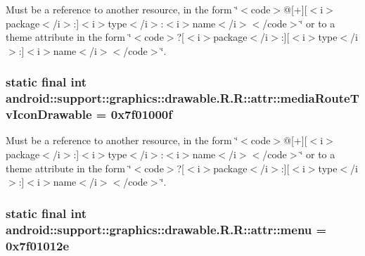 Must be a reference to another resource, in the form \char`\"{}$<$code$>$@\mbox{[}+\mbox{]}\mbox{[}$<$i$>$package$<$/i$>$:\mbox{]}$<$i$>$type$<$/i$>$:$<$i$>$name$<$/i$>$$<$/code$>$\char`\"{} or to a theme attribute in the form \char`\"{}$<$code$>$?\mbox{[}$<$i$>$package$<$/i$>$:\mbox{]}\mbox{[}$<$i$>$type$<$/i$>$:\mbox{]}$<$i$>$name$<$/i$>$$<$/code$>$\char`\"{}. \hypertarget{classandroid_1_1support_1_1graphics_1_1drawable_1_1_r_1_1attr_d38f866d8e4f17061aae25a6fe1066c7}{
\subsubsection[{mediaRouteTvIconDrawable}]{\setlength{\rightskip}{0pt plus 5cm}static final int android::support::graphics::drawable.R.R::attr::mediaRouteTvIconDrawable = 0x7f01000f}}
\label{classandroid_1_1support_1_1graphics_1_1drawable_1_1_r_1_1attr_d38f866d8e4f17061aae25a6fe1066c7}


Must be a reference to another resource, in the form \char`\"{}$<$code$>$@\mbox{[}+\mbox{]}\mbox{[}$<$i$>$package$<$/i$>$:\mbox{]}$<$i$>$type$<$/i$>$:$<$i$>$name$<$/i$>$$<$/code$>$\char`\"{} or to a theme attribute in the form \char`\"{}$<$code$>$?\mbox{[}$<$i$>$package$<$/i$>$:\mbox{]}\mbox{[}$<$i$>$type$<$/i$>$:\mbox{]}$<$i$>$name$<$/i$>$$<$/code$>$\char`\"{}. \hypertarget{classandroid_1_1support_1_1graphics_1_1drawable_1_1_r_1_1attr_a9230761a4eb913b0b899365b8a3d621}{
\subsubsection[{menu}]{\setlength{\rightskip}{0pt plus 5cm}static final int android::support::graphics::drawable.R.R::attr::menu = 0x7f01012e}}
\label{classandroid_1_1support_1_1graphics_1_1drawable_1_1_r_1_1attr_a9230761a4eb913b0b899365b8a3d621}


